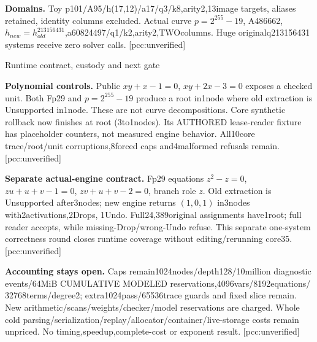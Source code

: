 \documentclass[10pt]{article}
\begin{document}
\textbf{Domains.} Toy p101/A95/h(17,12)/a17/q3/k8,arity2,13image targets,
aliases retained, identity columns excluded. Actual curve $p=2^{255}-19$,
A486662,$h_{new}=h_{old}^{213156431}$,a60824497/q1/k2,arity2,TWOcolumns.
Huge originalq213156431 systems receive zero solver calls. [pcc:unverified]

\newpage
\begin{center}\Large Runtime contract, custody and next gate\end{center}
\textbf{Polynomial controls.} Public $xy+x-1=0$, $xy+2x-3=0$ exposes a
checked unit. Both Fp29 and $p=2^{255}-19$ produce a root in1node where old
extraction is Unsupported in1node. These are not curve decompositions.
Core synthetic rollback now finishes at root (3to1nodes). Its AUTHORED
lease-reader fixture has placeholder counters, not measured engine behavior.
All10core trace/root/unit corruptions,8forced caps and4malformed refusals
remain. [pcc:unverified]

\textbf{Separate actual-engine contract.} Fp29 equations $z^2-z=0$,
$zu+u+v-1=0$, $zv+u+v-2=0$, branch role $z$. Old extraction is Unsupported
after3nodes; new engine returns $(1,0,1)$ in3nodes with2activations,2Drops,
1Undo. Full24,389original assignments have1root; full reader accepts, while
missing-Drop/wrong-Undo refuse. This separate one-system correctness round
closes runtime coverage without editing/rerunning core35. [pcc:unverified]

\textbf{Accounting stays open.} Caps remain1024nodes/depth128/10million
diagnostic events/64MiB CUMULATIVE MODELED reservations,4096vars/8192equations/
32768terms/degree2; extra1024pass/65536trace guards and fixed slice remain.
New arithmetic/scans/weights/checker/model reservations are charged. Whole
cold parsing/serialization/replay/allocator/container/live-storage costs remain
unpriced. No timing,speedup,complete-cost or exponent result. [pcc:unverified]
\end{document}
